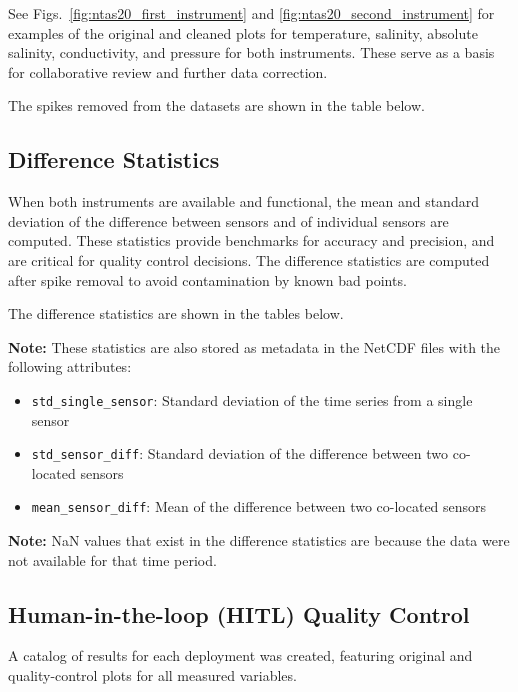 See Figs.~\ref{fig:ntas20_first_instrument} and \ref{fig:ntas20_second_instrument} for examples of the original and cleaned plots for temperature, salinity, absolute salinity, conductivity, and pressure for both instruments.
These serve as a basis for collaborative review and further data correction.

The spikes removed from the datasets are shown in the table below.



\subsection{Difference Statistics}
When both instruments are available and functional, 
the mean and standard deviation of the difference between sensors and of individual sensors are computed. 
These statistics provide benchmarks for accuracy and precision, and are critical for quality control decisions.
The difference statistics are computed after spike removal to avoid contamination by known bad points.

The difference statistics are shown in the tables below.



\textbf{Note:} These statistics are also stored as metadata in the NetCDF files with the following attributes:
\begin{itemize}
\item \texttt{std\_single\_sensor}: Standard deviation of the time series from a single sensor
\item \texttt{std\_sensor\_diff}: Standard deviation of the difference between two co-located sensors
\item \texttt{mean\_sensor\_diff}: Mean of the difference between two co-located sensors
\end{itemize}

\textbf{Note:} NaN values that exist in the difference statistics are because the data were not available for that time period.

\subsection{Human-in-the-loop (HITL) Quality Control}
A catalog of results for each deployment was created, featuring original and quality-control plots for all measured variables. 

